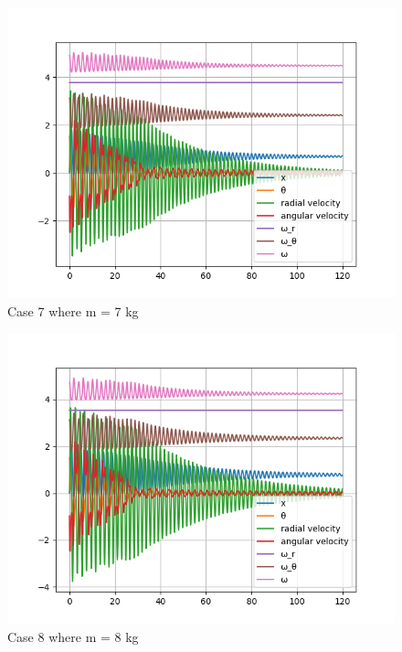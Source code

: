 \begin{figure}[H]
    \centering
    \includegraphics[width=15cm]{ExpPictures/m7.png}
    \caption{{Case 7 where m = 7 kg}}
    \label{}
\end{figure}
        
\begin{figure}[H]
    \centering
    \includegraphics[width=15cm]{ExpPictures/m8.png}
    \caption{{Case 8 where m = 8 kg}}
    \label{}
\end{figure}
        
